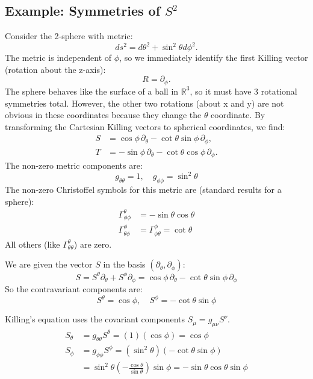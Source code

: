 \documentclass[11pt, a4paper]{report}
\begin{document}
\subsection*{Example: Symmetries of \(S^2\)}
Consider the 2-sphere with metric:
\begin{equation}
ds^2 = d\theta^2 + \sin^2\theta d\phi^2.
\end{equation}
The metric is independent of \(\phi\), so we immediately identify the first Killing vector (rotation about the z-axis):
\begin{equation}
R = \partial_\phi.
\end{equation}
The sphere behaves like the surface of a ball in \(\mathbb{R}^3\), so it must have 3 rotational symmetries total. However, the other two rotations (about x and y) are not obvious in these coordinates because they change the \(\theta\) coordinate. By transforming the Cartesian Killing vectors to spherical coordinates, we find:
\begin{align}
S &= \cos\phi \,\partial_\theta - \cot\theta \sin\phi \,\partial_\phi, \\
T &= -\sin\phi \,\partial_\theta - \cot\theta \cos\phi \,\partial_\phi.
\end{align}
The non-zero metric components are:
\begin{equation}
g_{\theta\theta} = 1, \quad g_{\phi\phi} = \sin^2\theta
\end{equation}
The non-zero Christoffel symbols for this metric are (standard results for a sphere):
\begin{align}
\Gamma^\theta_{\phi\phi} &= -\sin\theta\cos\theta \\
\Gamma^\phi_{\theta\phi} &= \Gamma^\phi_{\phi\theta} = \cot\theta
\end{align}
All others (like $\Gamma^\theta_{\theta\theta}$) are zero.

We are given the vector $S$ in the basis $(\partial_\theta, \partial_\phi)$:
\begin{equation}
S = S^\theta \partial_\theta + S^\phi \partial_\phi = \cos\phi \,\partial_\theta - \cot\theta \sin\phi \,\partial_\phi
\end{equation}
So the contravariant components are:
\begin{equation}
S^\theta = \cos\phi, \quad S^\phi = -\cot\theta \sin\phi
\end{equation}

Killing's equation uses the covariant components $S_\mu = g_{\mu\nu}S^\nu$.
\begin{align}
S_\theta &= g_{\theta\theta} S^\theta = (1)(\cos\phi) = \cos\phi \\
S_\phi &= g_{\phi\phi} S^\phi = (\sin^2\theta)(-\cot\theta \sin\phi) \nonumber \\
       &= \sin^2\theta \left(-\frac{\cos\theta}{\sin\theta}\right)\sin\phi = -\sin\theta\cos\theta\sin\phi
\end{align}
\end{document}
